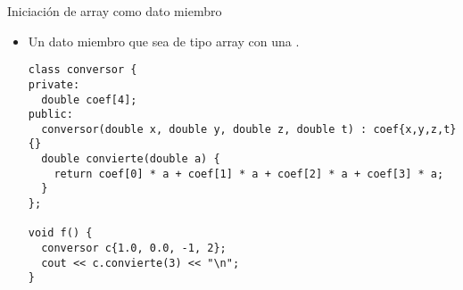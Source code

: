 \begin{frame}[t,fragile]{Iniciación de array como dato miembro}
\begin{itemize}
  \item Un dato miembro que sea de tipo array  
        con una .
\begin{lstlisting}
class conversor {
private:
  double coef[4];
public:
  conversor(double x, double y, double z, double t) : coef{x,y,z,t} {}
  double convierte(double a) {
    return coef[0] * a + coef[1] * a + coef[2] * a + coef[3] * a;
  }
};

void f() {
  conversor c{1.0, 0.0, -1, 2};
  cout << c.convierte(3) << "\n";
}
\end{lstlisting}
\end{itemize}
\end{frame}
